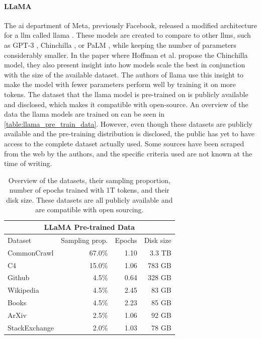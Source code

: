     \paragraph{LLaMA\\}
    The \gls{ai} department of Meta, previously Facebook, released a modified architecture for a \gls{llm} called \gls{llama} \cite{touvronLLaMAOpenEfficient2023}.
    These models are created to compare to other \glspl{llm}, such as GPT-3 \cite{brownLanguageModelsAre2020}, Chinchilla \cite{hoffmannTrainingComputeOptimalLarge2022}, or PaLM \cite{chowdheryPaLMScalingLanguage2022}, while keeping the number of parameters considerably smaller. In the paper where Hoffman et al. propose the Chinchilla model, they also present insight into how models scale the best in conjunction with the size of the available dataset. The authors of \gls{llama} use this insight to make the model with fewer parameters perform well by training it on more tokens. The dataset that the \gls{llama} model is pre-trained on is publicly available and disclosed, which makes it compatible with open-source. An overview of the data the \gls{llama} models are trained on can be seen in \autoref{table:llama_pre_train_data}. However, even though these datasets are publicly available and the pre-training distribution is disclosed, the public has yet to have access to the complete dataset actually used. Some sources have been scraped from the web by the authors, and the specific criteria used are not known at the time of writing.


    \begin{table}[htb]
    \centering
    \begin{tabular}{ l r r r } 
        
            \multicolumn{4}{c}{\textbf{LLaMA Pre-trained Data}}\\ [0.5ex] 
           \toprule
           Dataset & Sampling prop. & Epochs & Disk size \\
        \midrule
            CommonCrawl & 67.0\% & 1.10 & 3.3 TB \\
            C4 & 15.0\% & 1.06 & 783 GB\\
            Github & 4.5\% & 0.64 & 328 GB\\
            Wikipedia & 4.5\% & 2.45 & 83 GB\\
            Books & 4.5\% & 2.23 & 85 GB\\
            ArXiv & 2.5\% & 1.06 & 92 GB \\
            StackExchange & 2.0\% & 1.03 & 78 GB\\[0.5ex]
        \bottomrule
    \end{tabular}
    \caption{Overview of the datasets, their sampling proportion, number of epochs trained with 1T tokens, and their disk size. These datasets are all publicly available and are compatible with open sourcing.}
    \label{table:llama_pre_train_data}
    \end{table}
    
